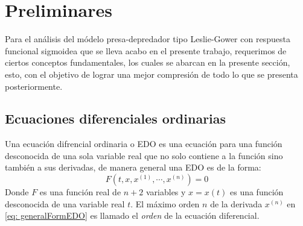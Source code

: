 \chapter{Preliminares}
    Para el análisis del módelo presa-depredador tipo Leslie-Gower con respuesta funcional sigmoidea que se lleva acabo en el presente trabajo, requerimos de ciertos conceptos fundamentales, los cuales se abarcan en la presente sección, esto, con el objetivo de lograr una mejor compresión de todo lo que se presenta posteriormente.
    
    \section{Ecuaciones diferenciales ordinarias}
        Una ecuación difrencial ordinaria o EDO es una ecuación para una función desconocida de una sola variable real que no solo contiene a la función sino también a sus derivadas, de manera general una EDO es de la forma:
        \begin{equation}
        	F(t, x, x^{(1)}, \cdots, x^{(n)}) = 0
        	\label{eq: generalFormEDO}
        \end{equation}
        Donde $F$ es una función real de $n+2$ variables y $x = x(t)$ es una función desconocida de una variable real $t$. El máximo orden $n$ de la derivada $x^{(n)}$ en \eqref{eq: generalFormEDO} es llamado el \textit{orden} de la ecuación diferencial.
        